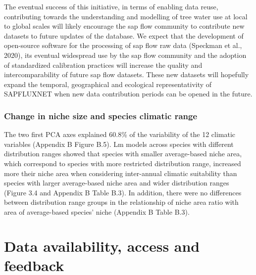 \documentclass[11pt,twoside]{reedthesis}
\begin{document}
The eventual success of this initiative, in terms of enabling data
reuse, contributing towards the understanding and modelling of tree
water use at local to global scales will likely encourage the sap flow
community to contribute new datasets to future updates of the database.
We expect that the development of open-source software for the
processing of sap flow raw data (Speckman et al., 2020), its eventual
widespread use by the sap flow community and the adoption of
standardized calibration practices will increase the quality and
intercomparability of future sap flow datasets. These new datasets will
hopefully expand the temporal, geographical and ecological
representativity of SAPFLUXNET when new data contribution periods can be
opened in the future.\par

\subsubsection{Change in niche size and species climatic
range}\label{change-in-niche-size-and-species-climatic-range}

The two first PCA axes explained 60.8\% of the variability of the 12
climatic variables (Appendix B Figure B.5). Lm models across species
with different distribution ranges showed that species with smaller
average-based niche area, which correspond to species with more
restricted distribution range, increased more their niche area when
considering inter-annual climatic suitability than species with larger
average-based niche area and wider distribution ranges (Figure 3.4 and
Appendix B Table B.3). In addition, there were no differences between
distribution range groups in the relationship of niche area ratio with
area of average-based species' niche (Appendix B Table B.3).\par

\section{Data availability, access and
feedback}\label{data-availability-access-and-feedback}
\end{document}
